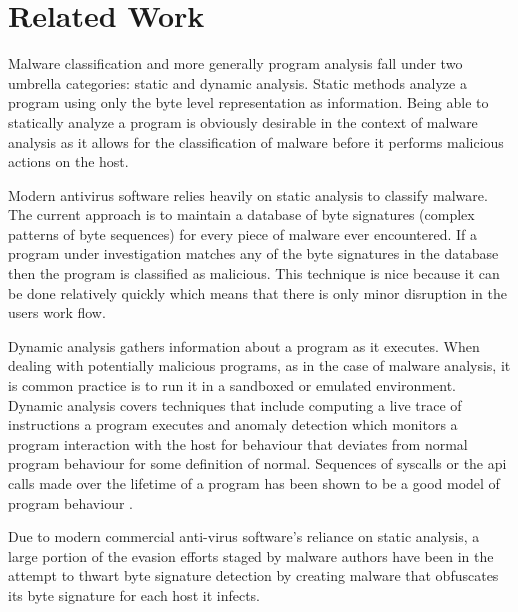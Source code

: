 \chapter{Related Work}

    Malware classification and more generally program analysis fall under two
    umbrella categories: static and dynamic analysis. Static methods analyze a
    program using only the byte level representation as information. Being able
    to statically analyze a program is obviously desirable in the context of
    malware analysis as it allows for the classification of malware before it
    performs malicious actions on the host.
    
    Modern antivirus software relies heavily on static analysis to classify
    malware. The current approach is to maintain a database of byte signatures
    (complex patterns of byte sequences) for every piece of malware ever
    encountered. If a program under investigation matches any of the byte
    signatures in the database then the program is classified as malicious.
    This technique is nice because it can be done relatively quickly which means
    that there is only minor disruption in the users work flow.

    Dynamic analysis gathers information about a program as it executes. When
    dealing with potentially malicious programs, as in the case of malware
    analysis, it is common practice is to run it in a sandboxed or emulated
    environment. Dynamic analysis covers techniques that include computing a
    live trace of instructions a program executes and anomaly detection which
    monitors a program interaction with the host for behaviour that deviates
    from normal program behaviour for some definition of normal. Sequences of
    syscalls or the api calls made over the lifetime of a program has been shown
    to be a good model of program behaviour \cite{api_calls}.

    Due to modern commercial anti-virus software's reliance on static analysis,
    a large portion of the evasion efforts staged by malware authors have been
    in the attempt to thwart byte signature detection by creating malware that
    obfuscates its byte signature for each host it infects.

